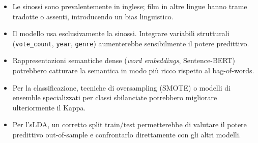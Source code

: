 \documentclass[12pt, a4paper]{article}
\newcommand{\code}[1]{\texttt{#1}}
\begin{document}
\begin{itemize}[leftmargin=1.8em]
  \item Le sinossi sono prevalentemente in inglese; film
        in altre lingue hanno trame tradotte o assenti,
        introducendo un bias linguistico.
  \item Il modello usa esclusivamente la sinossi. Integrare
        variabili strutturali (\code{vote\_count},
        \code{year}, \code{genre}) aumenterebbe
        sensibilmente il potere predittivo.
  \item Rappresentazioni semantiche dense
        (\textit{word embeddings}, Sentence-BERT) potrebbero
        catturare la semantica in modo più ricco rispetto
        al bag-of-words.
  \item Per la classificazione, tecniche di oversampling
        (SMOTE) o modelli di ensemble specializzati per
        classi sbilanciate potrebbero migliorare
        ulteriormente il Kappa.
  \item Per l'sLDA, un corretto split train/test permetterebbe
        di valutare il potere predittivo out-of-sample e
        confrontarlo direttamente con gli altri modelli.
\end{itemize}

\end{document}

